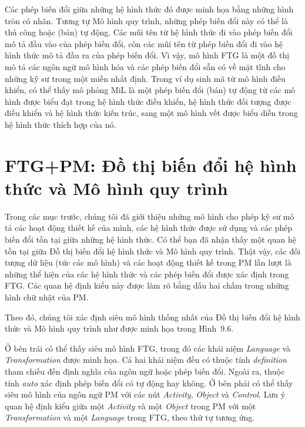 
Các phép biến đổi giữa những hệ hình thức đó được minh họa bằng những hình tròn có nhãn. Tương tự Mô hình quy trình, những phép biến đổi này có thể là thủ công hoặc (bán) tự động. Các mũi tên từ hệ hình thức đi vào phép biến đổi mô tả đầu vào của phép biến đổi, còn các mũi tên từ phép biến đổi đi vào hệ hình thức mô tả đầu ra của phép biến đổi. Vì vậy, mô hình FTG là một đồ thị mô tả các ngôn ngữ mô hình hóa và các phép biến đổi sẵn có về mặt tĩnh cho những kỹ sư trong một miền nhất định. Trong ví dụ sinh mã từ mô hình điều khiển, có thể thấy mô phỏng MiL là một phép biến đổi (bán) tự động từ các mô hình được biểu đạt trong hệ hình thức điều khiển, hệ hình thức đối tượng được điều khiển và hệ hình thức kiến trúc, sang một mô hình vết được biểu diễn trong hệ hình thức thích hợp của nó.

\section{FTG+PM: Đồ thị biến đổi hệ hình thức và Mô hình quy trình}
Trong các mục trước, chúng tôi đã giới thiệu những mô hình cho phép kỹ sư mô tả các hoạt động thiết kế của mình, các hệ hình thức được sử dụng và các phép biến đổi tồn tại giữa những hệ hình thức. Có thể bạn đã nhận thấy một quan hệ tồn tại giữa Đồ thị biến đổi hệ hình thức và Mô hình quy trình. Thật vậy, các đối tượng dữ liệu
(tức các mô hình) và các hoạt động thiết kế trong PM lần lượt là những thể hiện của các hệ hình thức và các phép biến đổi được xác định trong FTG. Các quan hệ định kiểu này được làm rõ bằng dấu hai chấm trong những hình chữ nhật của PM.

Theo đó, chúng tôi xác định siêu mô hình thống nhất của Đồ thị biến đổi hệ hình thức và Mô hình quy trình như được minh họa trong Hình~9.6.


Ở bên trái có thể thấy siêu mô hình FTG, trong đó các khái niệm \emph{Language} và \emph{Transformation} được minh họa. Cả hai khái niệm đều có thuộc tính \emph{definition} tham chiếu đến định nghĩa của ngôn ngữ hoặc phép biến đổi. Ngoài ra, thuộc tính \emph{auto} xác định phép biến đổi có tự động hay không. Ở bên phải có thể thấy siêu mô hình của ngôn ngữ PM với các nút \emph{Activity}, \emph{Object} và \emph{Control}. Lưu ý quan hệ định kiểu giữa một \emph{Activity} và một \emph{Object} trong PM với một \emph{Transformation} và một \emph{Language} trong FTG, theo thứ tự tương ứng.

